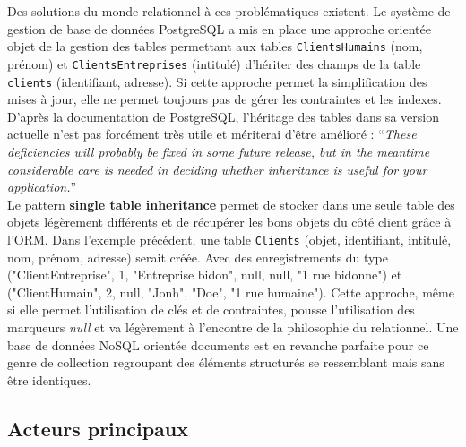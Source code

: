 	\vspace{10px}

	Des solutions du monde relationnel à ces problématiques existent. Le système de gestion de base de données PostgreSQL a mis en place une approche orientée objet de la gestion des tables permettant aux tables \texttt{ClientsHumains} (nom, prénom) et \texttt{ClientsEntreprises} (intitulé) d'hériter des champs de la table \texttt{clients} (identifiant, adresse). Si cette approche permet la simplification des mises à jour, elle ne permet toujours pas de gérer les contraintes et les indexes. D'après la documentation de PostgreSQL, l'héritage des tables dans sa version actuelle n'est pas forcément très utile et mériterai d'être amélioré :
	\enquote{\textit{These deficiencies will probably be fixed in some future release, but in the meantime considerable care is needed in deciding whether inheritance is useful for your application.}}\cite{Postgre_inheritance}\\

	Le pattern \textbf{single table inheritance} permet de stocker dans une seule table des objets légèrement différents et de récupérer les bons objets du côté client grâce à l'ORM. Dans l'exemple précédent, une table \texttt{Clients} (objet, identifiant, intitulé, nom, prénom, adresse) serait créée. Avec des enregistrements du type ("ClientEntreprise", 1, "Entreprise bidon", null, null, "1 rue bidonne") et ("ClientHumain", 2, null, "Jonh", "Doe", "1 rue humaine"). Cette approche, même si elle permet l'utilisation de clés et de contraintes, pousse l'utilisation des marqueurs \textit{null} et va légèrement à l'encontre de la philosophie du relationnel. Une base de données NoSQL orientée documents est en revanche parfaite pour ce genre de collection regroupant des éléments structurés se ressemblant mais sans être identiques.

\subsection{Acteurs principaux}

